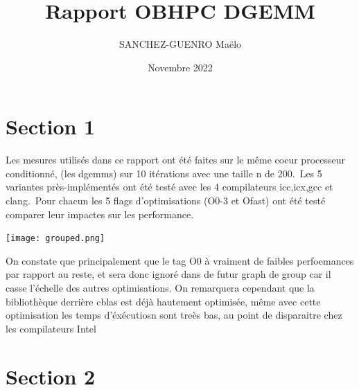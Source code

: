 \documentclass{article}
\title{Rapport OBHPC DGEMM}
\author{SANCHEZ-GUENRO Maëlo }
\date{Novembre 2022}
\begin{document}
\maketitle

\section{Section 1}
Les mesures utilisés dans ce rapport ont été faites sur le même coeur processeur conditionné, (les dgemms) sur 10 itérations avec une taille n de 200.\
Les 5 variantes près-implémentés ont été testé avec les 4 compilateurs icc,icx,gcc et clang.\
Pour chacun les 5 flags d'optimisations (O0-3 et Ofast) ont été testé comparer leur impactes sur les performance. \


\texttt{[image: grouped.png]}\

On constate que principalement que le tag O0 à vraiment de faibles perfoemances par rapport au reste, et sera donc ignoré dans de futur graph de group car il casse l'échelle des autres optimisations. On remarquera cependant que la bibliothèque derrière cblas est déjà hautement optimisée, même avec cette optimisation les temps d'éxécutiosn sont treès bas, au point de disparaitre chez les compilateurs Intel

\section{Section 2}
\end{document}
